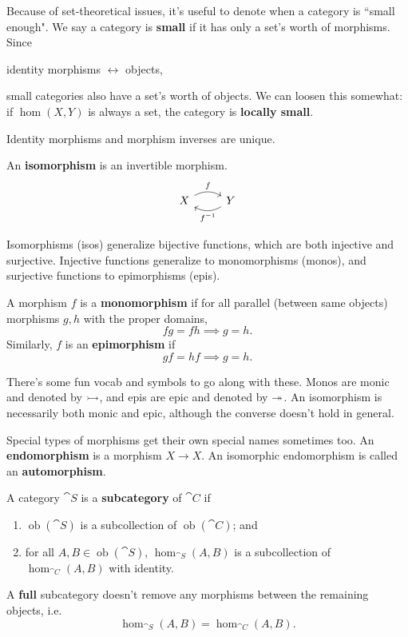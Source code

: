 \documentclass[twoside,10pt]{report}
\DeclareMathOperator{\ob}{ob}
\begin{document}
Because of set-theoretical issues, it's useful to denote when a category is ``small enough". We say a category is \textbf{small} if it has only a set's worth of morphisms. Since
\begin{center}
	identity morphisms $\leftrightarrow $ objects,
\end{center}
small categories also have a set's worth of objects. We can loosen this somewhat: if $\hom(X,Y)$ is always a set, the category is \textbf{locally small}.

\begin{prop}
Identity morphisms and morphism inverses are unique.
\end{prop}

\begin{defn}[]
An \textbf{isomorphism} is an invertible morphism.
\[
\begin{tikzcd}
	X \rar[bend left]{f} & Y \lar[bend left]{f^{-1}}
\end{tikzcd}
\] 
\end{defn}
Isomorphisms (isos) generalize bijective functions, which are both injective and surjective. Injective functions generalize to monomorphisms (monos), and surjective functions to epimorphisms (epis).

\begin{defn}[]
	A morphism $f$ is a \textbf{monomorphism} if for all parallel (between same objects) morphisms $g,h$ with the proper domains,
	\[
	fg = fh \implies g=h.
	\] Similarly, $f$ is an \textbf{epimorphism} if
	\[
	gf = hf \implies g=h.
	\] 
\end{defn}
There's some fun vocab and symbols to go along with these. Monos are monic and denoted by $\rightarrowtail$, and epis are epic and denoted by $\twoheadrightarrow$. An isomorphism is necessarily both monic and epic, although the converse doesn't hold in general.

Special types of morphisms get their own special names sometimes too. An \textbf{endomorphism} is a morphism $X\to X$. An isomorphic endomorphism is called an \textbf{automorphism}.
\begin{defn}
	A category $\cat{S}$ is a \textbf{subcategory} of $\cat{C}$ if
	\begin{enumerate}
		\item $\ob(\cat{S})$ is a subcollection of $\ob(\cat{C})$; and
		\item for all $A, B \in \ob(\cat{S})$, $\hom_{\cat{S}}(A,B)$ is a subcollection of $\hom_{\cat{C}}(A,B)$ with identity.
	\end{enumerate}
\end{defn}
A \textbf{full} subcategory doesn't remove any morphisms between the remaining objects, i.e.
\[
	\hom_{\cat{S} }(A,B) = \hom_{\cat{C} }(A,B).
\]
\end{document}

